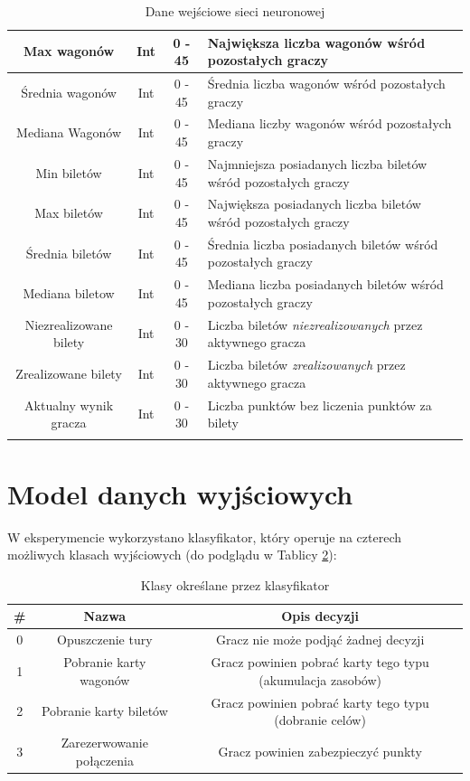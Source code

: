 \documentclass[12pt, oneside]{report}
\begin{document}
\begin{longtable}[h]{| c | c | c | p{6.5cm} |}
		Max wagonów  & Int & 0 - 45 & Największa liczba wagonów wśród pozostałych graczy \\ \hline
		Średnia wagonów  & Int & 0 - 45 & Średnia liczba wagonów wśród pozostałych graczy  \\ \hline
		Mediana Wagonów & Int & 0 - 45 & Mediana liczby wagonów wśród pozostałych graczy  \\ \hline
		Min biletów & Int & 0 - 45 & Najmniejsza posiadanych liczba biletów wśród pozostałych graczy  \\ \hline
		Max biletów & Int & 0 - 45 & Największa posiadanych liczba biletów wśród pozostałych graczy  \\ \hline
		Średnia biletów & Int & 0 - 45 & Średnia liczba posiadanych biletów wśród pozostałych graczy  \\ \hline
		Mediana biletow & Int & 0 - 45 & Mediana liczba posiadanych biletów wśród pozostałych graczy  \\ \hline
		Niezrealizowane bilety & Int & 0 - 30 & Liczba biletów \textit{niezrealizowanych} przez aktywnego gracza \\ \hline
		Zrealizowane bilety & Int & 0 - 30 & Liczba biletów \textit{zrealizowanych} przez aktywnego gracza \\ \hline
		Aktualny wynik gracza & Int & 0 - 30 & Liczba punktów bez liczenia punktów za bilety \\ \hline
		\caption{Dane wejściowe sieci neuronowej}
		\label{table:algo_input}
	\end{longtable}
	
	\section{Model danych wyjściowych}
	W eksperymencie wykorzystano klasyfikator, który operuje na czterech możliwych klasach wyjściowych (do podglądu w Tablicy \ref{table:algo_classifcator}):
	\begin{table}[h]	
		\begin{center}
			\begin{tabular}{| c | c | c |} \hline
				\# & Nazwa & Opis decyzji \\ \hline
				0 & Opuszczenie tury & Gracz nie może podjąć żadnej decyzji \\ \hline
				1 & Pobranie karty wagonów & Gracz powinien pobrać karty tego typu (akumulacja zasobów) \\ \hline
				2 & Pobranie karty biletów & Gracz powinien pobrać karty tego typu (dobranie celów) \\ \hline
				3 & Zarezerwowanie połączenia & Gracz powinien zabezpieczyć punkty \\ \hline
			\end{tabular}
			\caption{Klasy określane przez klasyfikator}
			\label{table:algo_classifcator}
		\end{center}
	\end{table}
\end{document}

